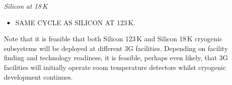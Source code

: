 \textit{Silicon at 	18\,K}
\begin{itemize}
\item SAME CYCLE AS SILICON AT 123\,K.
\end{itemize}

Note that it is feasible that both Silicon 123\,K and Silicon 18\,K cryogenic subsystems will be deployed at different 3G facilities.  Depending on facility finding and  technology readiness, it is  feasible, perhaps even likely,  that 3G facilities will initially operate room temperature detectors whilst cryogenic development continues.














